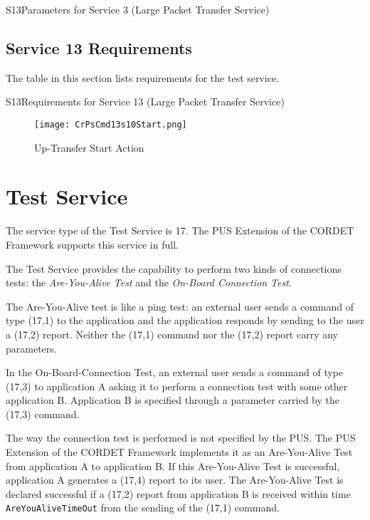 \documentclass{pnp_article}
\begin{document}
\begin{cr_par}{S13}{Parameters for Service 3 (Large Packet Transfer Service)}
\end{cr_par}

\newpage
\subsection{Service 13 Requirements}
The table in this section lists requirements for the test service.

\begin{cr_req}{S13}{Requirements for Service 13 (Large Packet Transfer Service)}
\end{cr_req}

\begin{figure}[H]
 \centering
 \texttt{[image: CrPsCmd13s10Start.png]}
 \caption{Up-Transfer Start Action}
 \label{fig:Cmd13s10Start}
\end{figure}




\section{Test Service}\label{sec:serv17}
The service type of the Test Service is 17. The PUS Extension of the CORDET Framework supports this service in full.

The Test Service provides the capability to perform two kinds of connections tests: the \textit{Are-You-Alive Test} and the \textit{On-Board Connection Test}.

The Are-You-Alive test is like a ping test: an external user sends a command of type (17,1) to the application and the application responds by sending to the user a (17,2) report. Neither the (17,1) command nor the (17,2) report carry any parameters. 

In the On-Board-Connection Test, an external user sends a command of type (17,3) to application A asking it to perform a connection test with some other application B. Application B is specified through a parameter carried by the (17,3) command. 

The way the connection test is performed is not specified by the PUS. The PUS Extension of the CORDET Framework implements it as an Are-You-Alive Test from application A to application B. If this Are-You-Alive Test is successful, application A generates a (17,4) report to its user. The Are-You-Alive Test is declared successful if a (17,2) report from application B is received within time \texttt{AreYouAliveTimeOut} from the sending of the (17,1) command.
\end{document}
